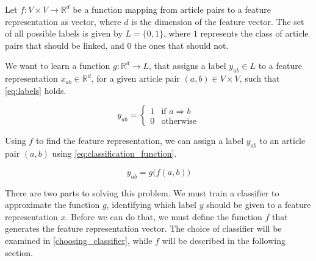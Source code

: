 
Let $f: V\times V \to \mathbb{R}^d$ be a function mapping from article pairs to a feature representation as vector, where $d$ is the dimension of the feature vector. The set of all possible labels is given by $L=\{0,1\}$, where $1$ represents the class of article pairs that should be linked, and $0$ the ones that should not.

We want to learn a function $g: \mathbb{R}^d \to L$, that assigns a label $y_{ab} \in L$ to a feature representation $x_{ab} \in \mathbb{R}^d$, for a given article pair $(a,b) \in V \times V$, such that \cref{eq:labels} holds.

\begin{equation}
\label{eq:labels}
    y_{ab}=
    \begin{cases}
        1 & \text{if } a \Rightarrow b\\
        0 & \text{otherwise}
    \end{cases}
\end{equation}

Using $f$ to find the feature representation, we can assign a label $y_{ab}$ to an article pair $(a,b)$ using \cref{eq:classification_function}.

\begin{equation}
\label{eq:classification_function}
  y_{ab} = g\big(f(a,b)\big)
\end{equation}

There are two parts to solving this problem. We must train a classifier to approximate the function $g$, identifying which label $y$ should be given to a feature representation $x$. Before we can do that, we must define the function $f$ that generates the feature representation vector. The choice of classifier will be examined in \cref{choosing_classifier}, while $f$ will be described in the following section.



